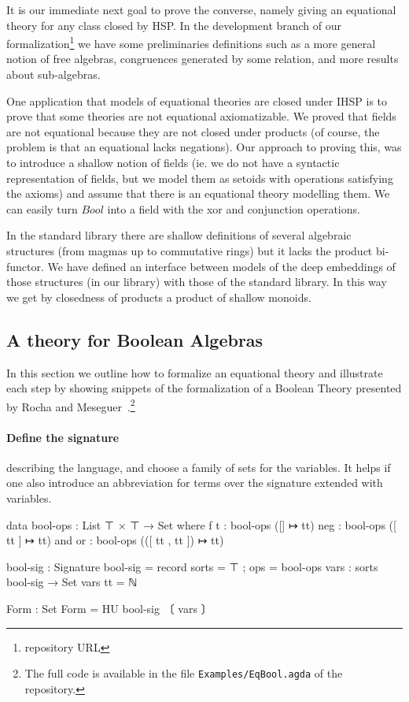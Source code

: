 
It is our immediate next goal to prove the converse, namely giving an
equational theory for any class closed by HSP. In the development
branch of our formalization\footnote{repository URL} we have some
preliminaries definitions such as a more general notion of free
algebras, congruences generated by some relation, and more results
about sub-algebras.

One application that models of equational theories are closed under
IHSP is to prove that some theories are not equational
axiomatizable. We proved that fields are not equational because they
are not closed under products (of course, the problem is that an
equational lacks negations). Our approach to proving this, was to
introduce a shallow notion of fields (ie. we do not have a syntactic
representation of fields, but we model them as setoids with operations
satisfying the axioms) and assume that there is an equational theory
modelling them. We can easily turn $\mathit{Bool}$ into a field with
the xor and conjunction operations. %

In the standard library there are shallow definitions of several
algebraic structures (from magmas up to commutative rings) but it
lacks the product bi-functor. We have defined an interface between
models of the deep embeddings of those structures (in our library)
with those of the standard library. In this way we get by closedness
of products a product of shallow monoids.

\subsection{A theory for Boolean Algebras }\label{sec:eqlog-theory-ol}
In this section we outline
how to formalize an equational theory and illustrate each step by
showing snippets of the formalization of a Boolean Theory presented by
Rocha and Meseguer~\cite{DBLP:conf/RelMiCS/RochaM08}.\footnote{The
  full code is available in the file \nolinkurl{Examples/EqBool.agda}
  of the repository.}

\paragraph*{Define the signature}
\label{sec:define-signature} describing the language, and choose
  a family of sets for the variables. It helps if one also introduce
  an abbreviation for terms over the signature extended with
  variables.
\begin{spec}
data bool-ops : List ⊤ × ⊤ → Set where
  f t    : bool-ops ([] ↦ tt)
  neg  : bool-ops ([ tt ] ↦ tt)
  and or  : bool-ops (([ tt , tt ]) ↦ tt)

bool-sig : Signature
bool-sig = record { sorts = ⊤ ; ops = bool-ops }
vars : sorts bool-sig → Set
vars tt = ℕ

Form : Set
Form = HU bool-sig 〔 vars 〕
\end{spec}


